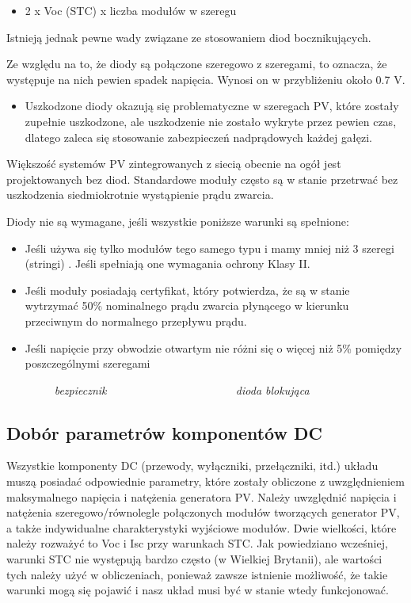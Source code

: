 \documentclass[12pt,a4paper]{article}
\begin{document}
\begin{itemize}
\item 2 x Voc (STC) x liczba modułów w szeregu 
\end{itemize}
Istnieją jednak pewne wady związane ze stosowaniem diod bocznikujących. 

Ze względu na to, że diody są połączone szeregowo z szeregami, to 
oznacza, że występuje na nich pewien spadek napięcia. Wynosi on w 
przybliżeniu około 0.7 V. 

\begin{itemize}
\item Uszkodzone diody okazują się problematyczne w szeregach PV, które 
zostały zupełnie uszkodzone, ale uszkodzenie nie zostało wykryte przez 
pewien czas, dlatego zaleca się stosowanie zabezpieczeń nadprądowych 
każdej gałęzi. 
\end{itemize}
Większość systemów PV zintegrowanych z siecią obecnie na ogół jest 
projektowanych bez diod. Standardowe moduły często są w stanie przetrwać 
bez uszkodzenia siedmiokrotnie wystąpienie prądu zwarcia. 

Diody nie są wymagane, jeśli wszystkie poniższe warunki są spełnione: 

\begin{itemize}
\item Jeśli używa się tylko modułów tego samego typu i mamy mniej niż 3 
szeregi (stringi) . Jeśli spełniają one wymagania ochrony Klasy II. 
\item Jeśli moduły posiadają certyfikat, który potwierdza, że są w 
stanie wytrzymać 50\% nominalnego prądu zwarcia płynącego w kierunku 
przeciwnym do normalnego przepływu prądu. 
\item Jeśli napięcie przy obwodzie otwartym nie różni się o więcej niż 
5\% pomiędzy poszczególnymi szeregami 
\end{itemize}


 

\textit{ }\ \ \ \ \textit{ }\ \ \ \ \textit{bezpiecznik }\ \ \ \ 
\textit{ }\ \ \ \ \textit{ }\ \ \ \ \textit{ }\ \ \ \ \textit{ }\ \ 
\ \ \textit{dioda blokująca }

\subsection{Dobór parametrów komponentów DC }


Wszystkie komponenty DC (przewody, wyłączniki, przełączniki, itd.) 
układu muszą posiadać odpowiednie parametry, które zostały obliczone z 
uwzględnieniem maksymalnego napięcia i natężenia generatora PV. Należy 
uwzględnić napięcia i natężenia szeregowo/równolegle połączonych modułów 
tworzących generator PV, a także indywidualne charakterystyki wyjściowe 
modułów. Dwie wielkości, które należy rozważyć to Voc i Isc przy 
warunkach STC. Jak powiedziano wcześniej, warunki STC nie występują 
bardzo często (w Wielkiej Brytanii), ale wartości tych należy użyć w 
obliczeniach, ponieważ zawsze istnienie możliwość, że takie warunki mogą 
się pojawić i nasz układ musi być w stanie wtedy funkcjonować. 
\end{document}
